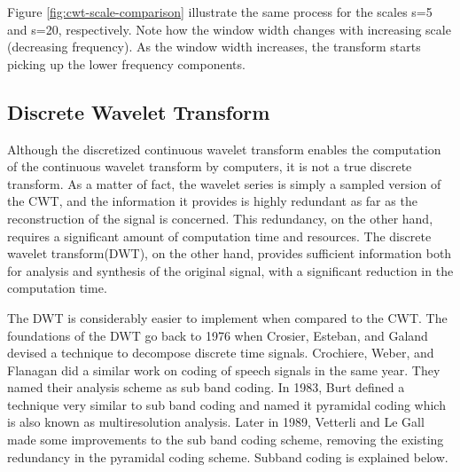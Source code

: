 \documentclass[12pt, a4paper, twoside]{report}
\begin{document}
Figure \ref{fig:cwt-scale-comparison} illustrate the same process for the scales s=5 and s=20, respectively. Note how the window width changes with increasing scale (decreasing frequency). As the window width increases, the transform starts picking up the lower frequency components.
\subsection{Discrete Wavelet Transform}
Although the discretized continuous wavelet transform enables the computation of the continuous wavelet transform by computers, it is not a true discrete transform. As a matter of fact, the wavelet series is simply a sampled version of the CWT, and the information it provides is highly redundant as far as the reconstruction of the signal is concerned. This redundancy, on the other hand, requires a significant amount of computation time and resources. The discrete wavelet transform(DWT), on the other hand, provides sufficient information both for analysis and synthesis of the original signal, with a significant reduction in the computation time.
\par
The DWT is considerably easier to implement when compared to the CWT. The foundations of the DWT go back to 1976 when Crosier, Esteban, and Galand devised a technique to decompose discrete time signals. Crochiere, Weber, and Flanagan did a similar work on coding of speech signals in the same year. They named their analysis scheme as sub band coding. In 1983, Burt defined a technique very similar to sub band coding and named it pyramidal coding which is also known as multiresolution analysis. Later in 1989, Vetterli and Le Gall made some improvements to the sub band coding scheme, removing the existing redundancy in the pyramidal coding scheme. Subband coding is explained below.
\end{document}
